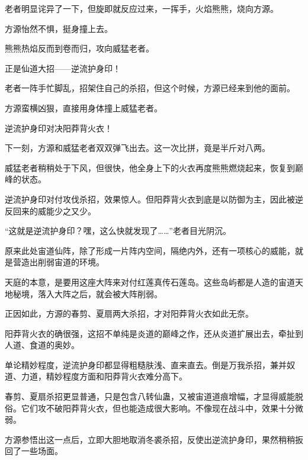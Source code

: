 \begin{this_body}
老者明显诧异了一下，但旋即就反应过来，一挥手，火焰熊熊，烧向方源。

方源怡然不惧，挺身撞上去。

熊熊热焰反而到卷而归，攻向威猛老者。

正是仙道大招——逆流护身印！

老者一阵手忙脚乱，招架住自己的杀招，但这个时候，方源已经来到他的面前。

方源蛮横凶狠，直接用身体撞上威猛老者。

逆流护身印对决阳莽背火衣！

下一刻，方源和威猛老者双双弹飞出去。这一次比拼，竟是半斤对八两。

威猛老者稍稍处于下风，但很快，他全身上下的火衣再度熊熊燃烧起来，恢复到巅峰的状态。

逆流护身印对付攻伐杀招，效果惊人。但阳莽背火衣到底是以防御为主，因此被逆反回来的威能少之又少。

“这就是逆流护身印？嘿，这么快就发现了……”老者目光阴沉。

原来此处宙道仙阵，除了形成一片阵内空间，隔绝内外，还有一项核心的威能，就是营造出削弱宙道的环境。

天庭的本意，是要用这座大阵来对付红莲真传石莲岛。这些岛屿都是人造的宙道天地秘境，落入大阵之后，就会被大阵削弱。

正因如此，方源的春剪、夏扇两大杀招，才对阳莽背火衣如此无奈。

阳莽背火衣的确很强，这招不单纯是炎道的巅峰之作，还从炎道扩展出去，牵扯到人道、食道的奥妙。

单论精妙程度，逆流护身印都显得粗糙肤浅、直来直去。倒是万我杀招，兼并奴道、力道，精妙程度方面和阳莽背火衣难分高下。

春剪、夏扇杀招更显普通，只是包含八转仙蛊，又被宙道道痕增幅，才显得威能脱俗。它们攻不破阳莽背火衣，但也能造成很大影响。不像现在战斗中，效果十分微弱。

方源参悟出这一点后，立即大胆地取消冬裘杀招，反使出逆流护身印，果然稍稍扳回了一些场面。

\end{this_body}

